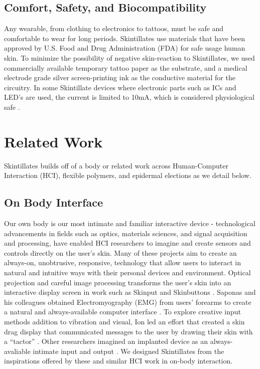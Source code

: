 \documentclass{sigchi}
\begin{document}
\subsection{Comfort, Safety, and Biocompatibility}
Any wearable, from clothing to electronics to tattoos, must be safe and comfortable to wear for long periods.  Skintillates use materials that have been approved by U.S. Food and Drug Administration (FDA) for safe usage human skin. To minimize the possibility of negative skin-reaction to Skintillates, we used commercially available temporary tattoo paper as the substrate, and a medical electrode grade silver screen-printing ink as the conductive material for the circuitry\cite{Anonymous:6vWXbuD5,Cristea:2009uq,Rattfalt:2013ts}. In some Skintillate devices where electronic parts such as ICs and LED's are used, the current is limited to 10mA, which is considered physiological safe \cite{Scherz:_BfVY1Mg}. 

\section{Related Work}
Skintillates builds off of a body or related work across Human-Computer Interaction (HCI), flexible polymers, and epidermal elections as we detail below.
\subsection{On Body Interface}
Our own body is our most intimate and familiar interactive device - technological advancements in fields such as optics, materials sciences, and signal acquisition and processing, have enabled HCI researchers to imagine and create sensors and controls directly on the user’s skin. Many of these projects aim to create an always-on, unobtrusive, responsive, technology that allow users to interact in natural and intuitive ways with their personal devices and environment. Optical projection and careful image processing transforms the user’s skin into an interactive display  screen  in  work  such   as   Skinput   and Skinbuttons \cite{ChrisHarrison:2010vi, Laput:2014du}. Saponas and his colleagues obtained Electromyography (EMG) from users’ forearms to create a natural and always-available computer interface \cite{Anonymous:2009ua}. To explore creative input methods addition to vibration and visual, Ion led an effort that created a skin drag display that communicated messages to the user by drawing  their skin with a ``tactor'' \cite{Ion:2015ig}. Other researchers imagined an implanted device as an always-avaliable intimate input and output \cite{Holz:2012ti}. We designed Skintillates from the inspirations offered by these and similar HCI work in on-body interaction.
\end{document}
